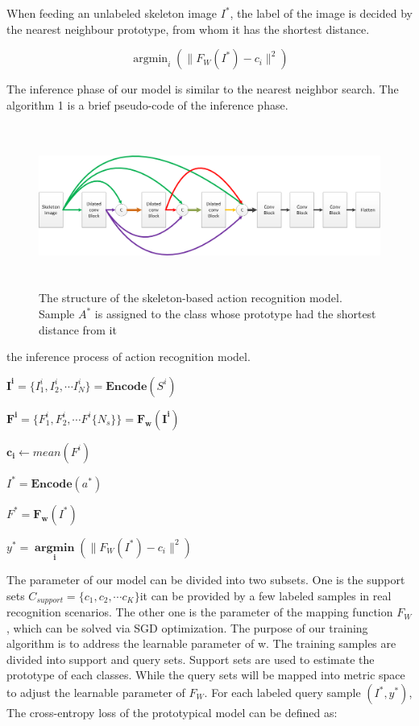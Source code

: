 \documentclass{bmvc2k}
\begin{document}
When feeding an unlabeled skeleton image $I^*$, the label of the image is decided by the nearest neighbour prototype, from whom it has the shortest distance.

$$\mathop{\arg\min}_{i} \left( \lVert F_W \left( I^\ast \right) - c_i \rVert^2 \right)$$

The inference phase of our model is similar to the nearest neighbor search. 
The algorithm 1 is a brief pseudo-code of the inference phase.

\begin{figure}	[htb]
\includegraphics[width=12.93cm,height=5.33cm]{images/Figure_4.png}
\caption{The structure of the skeleton-based action recognition model. Sample $A^\ast$ is assigned to the class whose prototype had the shortest distance from it}
\label{fig:4}
\end{figure}
\begin{algorithm}
\caption{ the inference process of action recognition model.}
\label{alg:1}
	{
	
	$\mathbf{I^i}=\{I^i_1,I^i_2,\cdots I^i_N\}=\mathbf{Encode}(S^i)$
	
	$\mathbf{F^i}=\{F^i_1,F^i_2,\cdots F^i \{ N_s \} \}=\mathbf{F_w(I^i)}$
	
	$\mathbf{c_i}\leftarrow mean(F^i)$
	
	}
	
	$I^\ast = \mathbf{Encode}(a^\ast) $
	
	$F^\ast = \mathbf{F_w}(I^\ast)$
	
	$y^\ast=\mathop{\mathbf{argmin}}\limits_{\mathbf{i}} \left( \lVert F_W \left( I^\ast \right) - c_i \rVert^2 \right)$
\end{algorithm}

The parameter of our model can be divided into two subsets. One is the support sets $C_{support}=\{c_1,c_2,\cdots c_K\}$it can be provided by a few labeled samples in real recognition scenarios. The other one is the parameter of the mapping function $F_W$, which can be solved via SGD optimization. The purpose of our training algorithm is to address the learnable parameter of w. The training samples are divided into support and query sets. Support sets are used to estimate the prototype of each classes. While the query sets will be mapped into metric space to adjust the learnable parameter of $F_W$. For each labeled query sample $(I^\ast,y^\ast)$, The cross-entropy loss of the prototypical model can be defined as:
\end{document}
